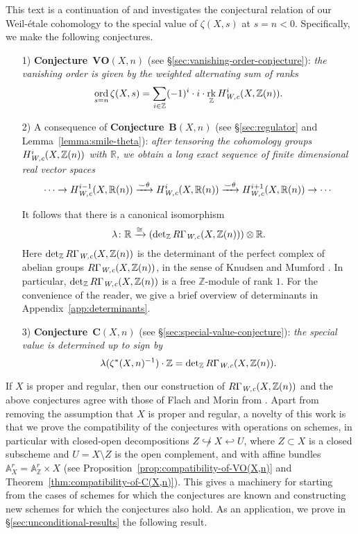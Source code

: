 \documentclass[10pt,a4paper,oneside]{article}
\DeclareMathOperator{\ord}{ord}
\DeclareMathOperator{\rk}{rk}
\newcommand{\RR}{\mathbb{R}}
\newcommand{\ZZ}{\mathbb{Z}}
\renewcommand{\AA}{\mathbb{A}}
\renewcommand{\det}{\operatorname{det}}
\newcommand{\Wc}{\text{\it W,c}}
\theoremstyle{myplain}
\theoremstyle{mydefinition}
\numberwithin{equation}{section}
\begin{document}
This text is a continuation of \cite{Beshenov-Weil-etale-1} and investigates the
conjectural relation of our Weil-\'{e}tale cohomology to the special value of
$\zeta (X,s)$ at $s = n < 0$.  Specifically, we make the following conjectures.

\begin{enumerate}
\item[1)] \textbf{Conjecture}~$\mathbf{VO} (X,n)$
  (see \S\ref{sec:vanishing-order-conjecture}):
  \emph{the vanishing order is given by the weighted alternating sum of ranks}
  \[ \ord_{s=n} \zeta (X,s) =
    \sum_{i\in \ZZ} (-1)^i \cdot i \cdot \rk_\ZZ H_\Wc^i (X, \ZZ(n)). \]

\item[2)] A consequence of \textbf{Conjecture}~$\mathbf{B} (X,n)$
  (see \S\ref{sec:regulator} and Lemma~\ref{lemma:smile-theta}):
  \emph{after tensoring the cohomology groups $H_\Wc^i (X, \ZZ (n))$ with $\RR$,
    we obtain a long exact sequence of finite dimensional real vector spaces}
  \[ \cdots \to H_\Wc^{i-1} (X, \RR (n)) \xrightarrow{\smile\theta}
    H_\Wc^i (X, \RR (n)) \xrightarrow{\smile\theta}
    H_\Wc^{i+1} (X, \RR (n)) \to \cdots \]

  It follows that there is a canonical isomorphism
  \[ \lambda\colon \RR \xrightarrow{\cong}
    (\det_\ZZ R\Gamma_\Wc (X, \ZZ (n))) \otimes \RR. \]
  Here $\det_\ZZ R\Gamma_\Wc (X, \ZZ (n))$ is the determinant of the
  perfect complex of abelian groups $R\Gamma_\Wc (X, \ZZ (n))$, in the sense of
  Knudsen and Mumford \cite{Knudsen-Mumford-1976}. In particular,
  $\det_\ZZ R\Gamma_\Wc (X, \ZZ (n))$ is a free $\ZZ$-module of rank
  $1$. For the convenience of the reader, we give a brief overview of
  determinants in Appendix~\ref{app:determinants}.

\item[3)] \textbf{Conjecture}~$\mathbf{C} (X,n)$
  (see \S\ref{sec:special-value-conjecture}):
  \emph{the special value is determined up to sign by}
  \[ \lambda (\zeta^* (X, n)^{-1}) \cdot \ZZ =
    \det_\ZZ R\Gamma_\Wc (X, \ZZ (n)). \]
\end{enumerate}

If $X$ is proper and regular, then our construction of
$R\Gamma_\Wc (X, \ZZ (n))$ and the above conjectures agree with those of Flach
and Morin from \cite{Flach-Morin-2018}. Apart from removing the assumption that
$X$ is proper and regular, a novelty of this work is that we prove the
compatibility of the conjectures with operations on schemes, in particular with
closed-open decompositions $Z \not\hookrightarrow X \hookleftarrow U$, where
$Z \subset X$ is a closed subscheme and $U = X\setminus Z$ is the open
complement, and with affine bundles $\AA_X^r = \AA_\ZZ^r \times X$ (see
Proposition~\ref{prop:compatibility-of-VO(X,n)} and
Theorem~\ref{thm:compatibility-of-C(X,n)}). This gives a machinery for starting
from the cases of schemes for which the conjectures are known and constructing
new schemes for which the conjectures also hold.  As an application, we prove in
\S\ref{sec:unconditional-results} the following result.
\end{document}
